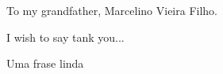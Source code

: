\begin{dedicatoria}
  To my grandfather, Marcelino Vieira Filho.
\end{dedicatoria}

\begin{agradecimentos}
    I wish to say tank you...
\end{agradecimentos}

\begin{epigrafe}
  Uma frase linda\\
\end{epigrafe}